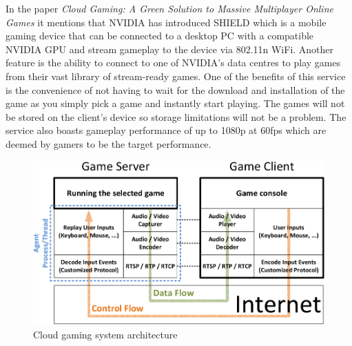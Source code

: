 In the paper \textit{Cloud Gaming: A Green Solution to Massive Multiplayer Online Games} \cite{chuah2014cloud} it mentions that NVIDIA has introduced SHIELD which is a mobile gaming device that can be connected to a desktop PC with a compatible NVIDIA GPU and stream gameplay to the device via 802.11n WiFi. Another feature is the ability to connect to one of NVIDIA's data centres to play games from their vast library of stream-ready games. One of the benefits of this service is the convenience of not having to wait for the download and installation of the game as you simply pick a game and instantly start playing. The games will not be stored on the client's device so storage limitations will not be a problem. The service also boasts gameplay performance of up to 1080p at 60fps which are deemed by gamers to be the target performance.

\begin{figure}[h]
 \includegraphics[width=\linewidth]{images/arch.png}
 \caption{Cloud gaming system architecture \cite{cloudarch}}
 \label{fig:arch}
\end{figure}

